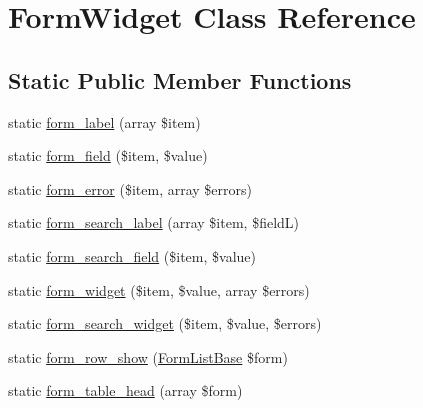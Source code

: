 \hypertarget{classapp_1_1models_1_1core_1_1_form_1_1_form_widget}{\section{Form\-Widget Class Reference}
\label{classapp_1_1models_1_1core_1_1_form_1_1_form_widget}
}
\subsection*{Static Public Member Functions}
\begin{DoxyCompactItemize}
\item 
static \hyperlink{classapp_1_1models_1_1core_1_1_form_1_1_form_widget_aa1c6f38d56d948d9c661e02f682c9500}{form\-\_\-label} (array \$item)
\item 
static \hyperlink{classapp_1_1models_1_1core_1_1_form_1_1_form_widget_a2c0b6fdb63ae0275b937a11f5dc6989f}{form\-\_\-field} (\$item, \$value)
\item 
static \hyperlink{classapp_1_1models_1_1core_1_1_form_1_1_form_widget_a63cacdf067803177ef266b7aa7c1a0ed}{form\-\_\-error} (\$item, array \$errors)
\item 
static \hyperlink{classapp_1_1models_1_1core_1_1_form_1_1_form_widget_ac4e2deedb91156aeaeb6419a8c252716}{form\-\_\-search\-\_\-label} (array \$item, \$field\-L)
\item 
static \hyperlink{classapp_1_1models_1_1core_1_1_form_1_1_form_widget_aa47f3ffbe90e75d3a1b46e9c9c7c911a}{form\-\_\-search\-\_\-field} (\$item, \$value)
\item 
static \hyperlink{classapp_1_1models_1_1core_1_1_form_1_1_form_widget_add6f646f5d95e00a8961a28a8238f5ca}{form\-\_\-widget} (\$item, \$value, array \$errors)
\item 
static \hyperlink{classapp_1_1models_1_1core_1_1_form_1_1_form_widget_a250ea6987e80f1ce2580bd68de2fcef1}{form\-\_\-search\-\_\-widget} (\$item, \$value, \$errors)
\item 
static \hyperlink{classapp_1_1models_1_1core_1_1_form_1_1_form_widget_a009f412169e434f74960d8e8b0eead81}{form\-\_\-row\-\_\-show} (\hyperlink{classapp_1_1models_1_1core_1_1_form_1_1_form_list_base}{Form\-List\-Base} \$form)
\item 
static \hyperlink{classapp_1_1models_1_1core_1_1_form_1_1_form_widget_ada3363bb2885ab35c13090503d583455}{form\-\_\-table\-\_\-head} (array \$form)
\end{DoxyCompactItemize}


